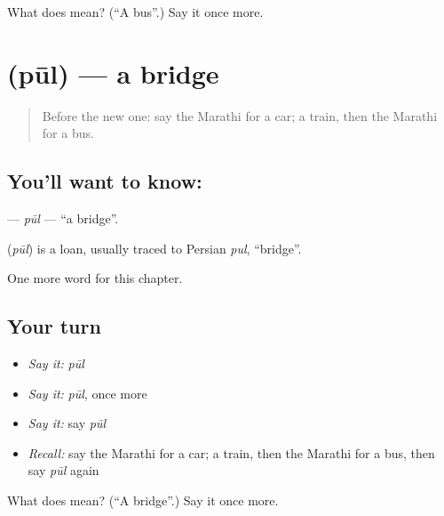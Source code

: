 \begin{tcolorbox}[breakable,colback=teal!4,colframe=teal!35!black,title={Before you move on}]
What does  mean? (\textquotedblleft{}A bus\textquotedblright{}.) Say it once more.
\end{tcolorbox}
\section[\texorpdfstring{\mr{पूल} (pūl)}{पूल (pūl)}]{ (pūl) — a bridge}

\label{lesson:MR-C114-pul}



\begin{quote}
Before the new one: say the Marathi for a car; a train, then the Marathi for a bus.
\end{quote}

\subsection*{You'll want to know: }
\textbf{} — \emph{pūl} — \textquotedblleft{}a bridge\textquotedblright{}.

\begin{cousinweb}
\textbf{} (\emph{pūl}) is a loan, usually traced to Persian \emph{pul}, \textquotedblleft{}bridge\textquotedblright{}.
\end{cousinweb}

\begin{grammarlens}[title={What you've built}]
One more word for this chapter.
\end{grammarlens}

\subsection*{Your turn}
\begin{itemize}
\raggedright
  \item \emph{Say it:} \emph{pūl}
  \item \emph{Say it:} \emph{pūl}, once more
  \item \emph{Say it:} say \emph{pūl}
  \item \emph{Recall:} say the Marathi for a car; a train, then the Marathi for a bus, then say \emph{pūl} again
\end{itemize}

\begin{tcolorbox}[breakable,colback=teal!4,colframe=teal!35!black,title={Before you move on}]
What does  mean? (\textquotedblleft{}A bridge\textquotedblright{}.) Say it once more.
\end{tcolorbox}
